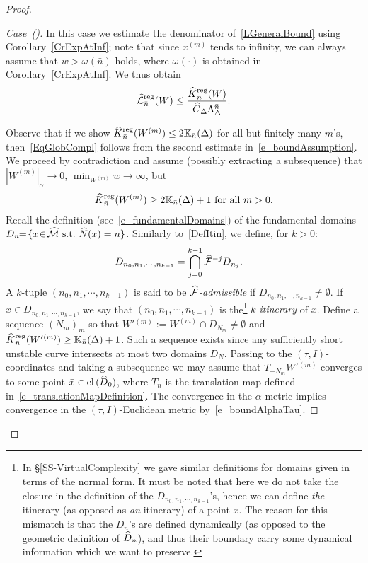 \documentclass[10pt]{amsart}
\theoremstyle{definition}\newtheorem{defi}[theo]{Definition}\newtheorem{rema}[theo]{Remark}\newtheorem{exam}[theo]{Example}\newtheorem{exem}[theo]{Example}\newtheorem{nota}[theo]{Notation}
\newcommand{\st}{\ \text{s.t.}\ }
\newcommand{\cl}[1]{\mathrm{cl}\,#1}
\newcommand{\LC}{\mathbb{K}}
\newcommand{\cm}{\mathcal{F}}
\newcommand{\csp}{\mathcal{M}}
\newcommand{\cmp}{\hat\cm}
\newcommand{\cspi}{\widehat{\csp}}
\newcommand{\brn}{\bar{n}}
\newcommand{\brx}{\bar{x}}
\newcommand{\hkreg}{\hat{K}^\text{reg}}
\newcommand{\hzreg}{\hat{\cL}^\text{reg}}
\newcommand{\law}[1]{\omega_{#1}}
\newcommand{\adm}{_{\alpha^{+}}}
\newcommand{\admName}{\alpha^{+}}
\newcommand{\Np}{\hat N}
\newcommand{\cL}{\mathcal{L}}
\newcommand{\privSeq}[2]{#1^{(#2)}}
\newcommand{\Wseq}[1]{\privSeq{W}{#1}}
\newcommand{\Wpseq}[1]{\privSeq{W'{}}{#1}}
\newcommand{\Dom}{D}
\newcommand{\hDom}{\hat D}
\renewcommand{\admName}{\alpha}
\renewcommand{\adm}{_{\alpha}}
\newcounter{casecount}
\renewcommand*\thecasecount{(\alph{casecount})}
\newenvironment{case}{\refstepcounter{casecount}\begin{proof}[{Case~\thecasecount}]}{\let\qed\relax\end{proof}}
\let\oldhat\hat
\renewcommand*{\hat}[1]{\mathchoice{\widehat{#1}}{\widehat{#1}}{\oldhat{#1}}{\oldhat{#1}}}
\begin{document}
\begin{proof}
\begin{case}
In this case we estimate the denominator of~\eqref{LGeneralBound} using Corollary~\ref{CrExpAtInf}; note that since $x^{(m)}$ tends to infinity, we can always assume that $w > \law{}(\bar n)$ holds, where $\law{}(\cdot)$ is obtained in Corollary~\ref{CrExpAtInf}. We thus obtain
\begin{align*}
\hzreg_{\brn}(W) \leq \frac{\hkreg_{\brn}(W)}{\hat{C}_{\Delta} \Lambda_\Delta^{\brn}}.
\end{align*}

Observe that if we show $\hkreg_{\bar n}(W^{(m)}) \leq 2\LC_{\bar n}(\Delta)$ for all but finitely many $m$'s, then~\eqref{EqGlobCompl} follows from the second estimate in~\eqref{e_boundAssumption}. We proceed by contradiction and assume (possibly extracting a subsequence) that $|\Wseq{m}|\adm\to 0$, $ \min_{\Wseq{m}} w\to\infty$, but
\begin{align*}
\hkreg_{\bar n}(\Wseq{m})\geq 2\LC_{\bar n}(\Delta)+1 \text{ for all }m > 0.
\end{align*}
Recall the definition (see~\eqref{e_fundamentalDomains}) of the fundamental domains $\Dom_n\!\!=\! \{x\!\in\!\cspi\st \Np(x) = n\}$. Similarly to~\eqref{DefItin}, we define, for $k > 0$:
\begin{align*}
\Dom_{n_0,n_1,\cdots,n_{k-1}} &= \bigcap_{j = 0}^{k-1}\cmp^{-j}\Dom_{n_j}.
\end{align*}
A $k$-tuple $(n_0,n_1,\!\cdots\!,n_{k-1})$ is said to be
\emph{$\cmp$-admissible} if $\Dom_{n_0,n_1,\cdots,n_{k-1}}\!\!\ne\!\emptyset$. If $x\in\Dom_{n_0,n_1,\cdots,n_{k-1}}$, we say that $(n_0,n_1,\cdots,n_{k-1})$ is the\footnote{In
\S\ref{SS-VirtualComplexity} we gave similar definitions for domains given in terms of the normal form. It must be noted that here we do not take the closure in the definition of the $\Dom_{n_0,n_1,\cdots,n_{k-1}}$'s, hence we can define \emph{the} itinerary (as opposed as \emph{an} itinerary) of a point $x$. The reason for this mismatch is that the $\Dom_n$'s are defined dynamically (as opposed to the geometric definition of $\hDom_n$), and thus their boundary carry some dynamical information which we want to preserve.} 
\emph{$k$-itinerary} of $x$. Define a sequence $(N_m)_m$ so that $\Wpseq{m} \!\!:= \Wseq{m}\cap D_{N_m}\ne\emptyset$ and $\hkreg_{\bar n}(\Wpseq{m})\ge \LC_{\bar n}(\Delta)+1$. Such a sequence exists since any sufficiently short unstable curve intersects at most two domains $D_N$. Passing to the $(\tau, I)$-coordinates and taking a subsequence we may assume that $T_{-N_m} \Wpseq{m}$ converges to some point $\brx\in \cl(\hDom_0)$, where $T_n$ is the translation map defined in~\eqref{e_translationMapDefinition}. The convergence in the $\admName$-metric implies convergence in the $(\tau,I)$-Euclidean metric by~\eqref{e_boundAlphaTau}.


\end{case}
\end{proof}
\end{document}
